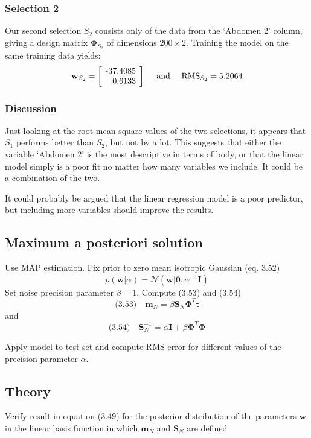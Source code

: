 \documentclass{article}
\newcommand{\vect}[1]{\ensuremath{\boldsymbol{\mathbf{#1}}}\xspace}
\begin{document}
\subsubsection{Selection 2}

Our second selection $S_2$ consists only of the data from the `Abdomen
2' column, giving a design matrix $\vect{\Phi}_{S_2}$ of dimensions
$200\times 2$. Training the model on the same training data yields:
\[
\vect{w}_{S_2} = \left[\!\begin{tabular}{r@{.}l}
  -37 & 4085\\
  0 & 6133
  \end{tabular}\!\right]\quad
\text{ and }\quad \mathrm{RMS}_{S_2} = 5.2064
\]

\subsubsection{Discussion}
Just looking at the root mean square values of the two selections, it
appears that $S_1$ performs better than $S_2$, but not by a lot. This
suggests that either the variable `Abdomen 2' is the most descriptive
in terms of body, or that the linear model simply is a poor fit no
matter how many variables we include. It could be a combination of the
two.

It could probably be argued that the linear regression model is a poor
predictor, but including more variables should improve the results.

\subsection{Maximum a posteriori solution}

Use MAP estimation. Fix prior to zero mean isotropic Gaussian (eq. 3.52)
\[
p(\vect{w}|\alpha) = \mathcal{N}(\vect{w}|\vect{0},\alpha^{-1}\vect{I})
\]
Set noise precision parameter $\beta = 1$. Compute (3.53) and (3.54)
\[
\text{(3.53)}\quad \vect{m}_N = \beta\vect{S}_N\vect{\Phi}^T\mathsf{t}
\]
and
\[
\text{(3.54)}\quad \vect{S}_N^{-1} = \alpha\vect{I} + \beta\vect{\Phi}^T\vect{\Phi}
\]

Apply model to test set and compute RMS error for different values of the precision parameter $\alpha$.

\subsection{Theory}

Verify result in equation (3.49) for the posterior distribution of the
parameters \vect{w} in the linear basis function in which $\vect{m}_N$
and $\vect{S}_N$ are defined 
\end{document}
